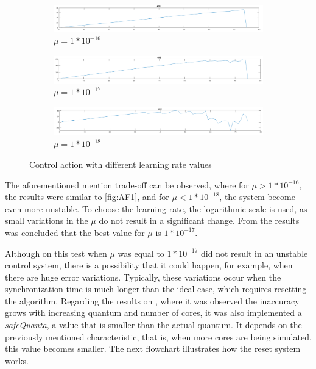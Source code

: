 \begin{figure}
\centering
\begin{subfigure}{\textwidth}
    \includegraphics[width=\textwidth]{Images/AF1.png}
    \caption{ $\mu = 1 * 10^{-16} $ }
    \label{fig:AF1}
\end{subfigure}
\begin{subfigure}{\textwidth}
    \includegraphics[width=\textwidth]{Images/AF2.png}
    \caption{ $\mu = 1 * 10^{-17}$ }
    \label{fig:AF2}
\end{subfigure}
\begin{subfigure}{\textwidth}
    \includegraphics[width=\textwidth]{Images/AF3.png}
    \caption{ $\mu = 1 * 10^{-18}$ }
    \label{fig:AF3}
\end{subfigure}
        
\caption{Control action with different learning rate values}
\label{fig:learningRateTests}
\end{figure}

 The aforementioned mention trade-off can be observed, where for $\mu > 1 * 10^{-16} $, the results were similar to \autoref{fig:AF1}, and 
 for $\mu < 1 * 10^{-18} $, the system become even more unstable. To choose the learning rate, the logarithmic scale is used, as small variations 
 in the $\mu$ do not result in a significant change. From the results was concluded that the best value for $\mu$ is $1 * 10^{-17}$. 

Although on this test when $\mu$ was equal to $1 * 10^{-17}$ did not result in an unstable control system, there is a possibility that it could 
happen, for example, when there are huge error variations. Typically, these variations occur when the synchronization time is much longer than the 
ideal case, which requires resetting the algorithm. Regarding the results on \cite{pargem5}, where it was observed the inaccuracy grows with 
increasing quantum and number of cores, it was also implemented a \textit{safeQuanta}, a value that is smaller than the actual quantum. It depends 
on the previously mentioned characteristic, that is, when more cores are being simulated, this value becomes smaller. 
The next flowchart illustrates how the reset system works.

